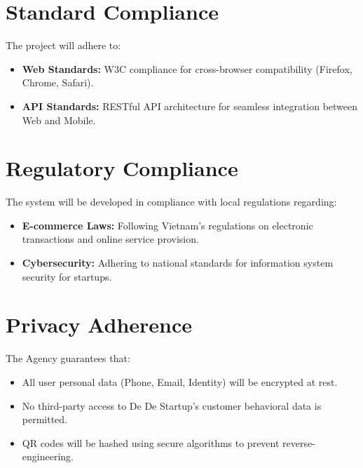 \section{Standard Compliance}
The project will adhere to:
\begin{itemize}
    \item \textbf{Web Standards:} W3C compliance for cross-browser compatibility (Firefox, Chrome, Safari).
    \item \textbf{API Standards:} RESTful API architecture for seamless integration between Web and Mobile.
\end{itemize}

\section{Regulatory Compliance}
The system will be developed in compliance with local regulations regarding:
\begin{itemize}
    \item \textbf{E-commerce Laws:} Following Vietnam's regulations on electronic transactions and online service provision.
    \item \textbf{Cybersecurity:} Adhering to national standards for information system security for startups.
\end{itemize}

\section{Privacy Adherence}
The Agency guarantees that:
\begin{itemize}
    \item All user personal data (Phone, Email, Identity) will be encrypted at rest.
    \item No third-party access to De De Startup's customer behavioral data is permitted.
    \item QR codes will be hashed using secure algorithms to prevent reverse-engineering.
\end{itemize}